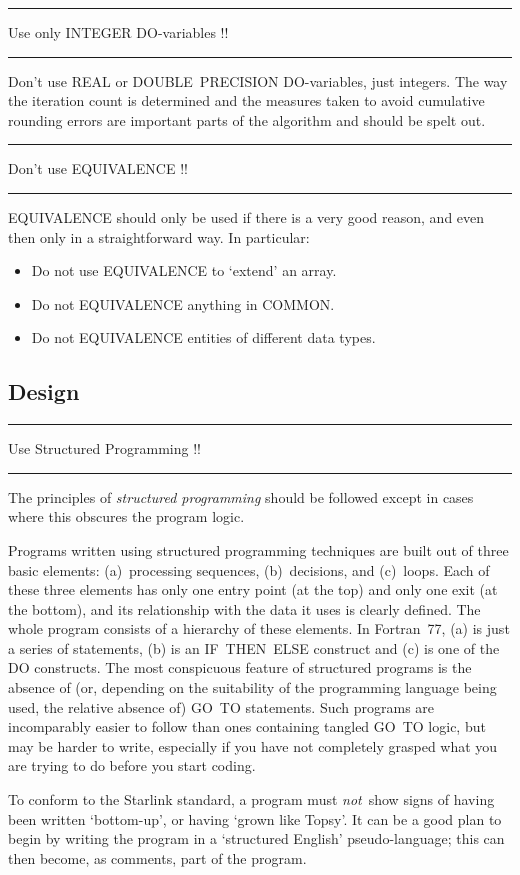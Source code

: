 \documentclass[twoside,11pt]{article}
\newcounter{sruleno}
\newcommand{\srule}[1]{
    \addtocounter{sruleno}{1}
    \goodbreak
    \rule[0.5ex]{\textwidth}{0.3mm}
    {\Large #1 \hfill {\thesruleno}}
    \rule[0.5ex]{\textwidth}{0.1mm}
}
\newcommand{\srule}[1]{
       \addtocounter{sruleno}{1}
       \begin{rawhtml} <HR> \end{rawhtml}
       {\Large \thesruleno}~~~~{\Large #1}
       \begin{rawhtml} <HR> \end{rawhtml}
       \end{tabular}
  }
\renewcommand{\_}{{\tt\char'137}}
\begin{document}
\srule{Use only INTEGER DO-variables !!}
Don't use REAL or DOUBLE~PRECISION DO-variables, just integers.
The way the iteration count is determined and the
measures taken to avoid cumulative rounding errors are
important parts of the algorithm and should be spelt out.

\srule{Don't use EQUIVALENCE !!}
EQUIVALENCE should only be used if there is a very good reason, and even then
only in a straightforward way.  In particular:
\begin{itemize}
\item Do not use EQUIVALENCE to `extend' an array.
\item Do not EQUIVALENCE anything in COMMON.
\item Do not EQUIVALENCE entities of different data types.
\end{itemize}

\goodbreak
\subsection{Design}

\srule{Use Structured Programming !!}
The principles of {\em structured programming} should
be followed except in cases where this obscures the program logic.

Programs written using structured programming techniques
are built out of three basic elements:
(a)~processing sequences, (b)~decisions, and
(c)~loops.  Each of these three elements has
only one entry point (at the top) and only one exit (at the
bottom), and its relationship with the data it uses is
clearly defined.  The whole program consists of a hierarchy of
these elements.  In Fortran~77, (a) is just a series of
statements, (b) is an IF~THEN~ELSE construct and (c) is one
of the DO constructs.  The most
conspicuous feature of structured programs is the
absence of (or, depending on the suitability of the programming
language being used, the relative absence of)
GO~TO statements.  Such programs are incomparably easier to follow
than ones containing tangled GO~TO logic, but may be harder to
write, especially if you have not completely
grasped what you are trying to do before you start coding.

To conform to the Starlink standard, a program must {\it not}\, show signs of
having been written `bottom-up', or having `grown like Topsy'.
It can be a good plan to begin by writing the program in a `structured English'
pseudo-language; this can then become, as comments, part of the program.
\end{document}
